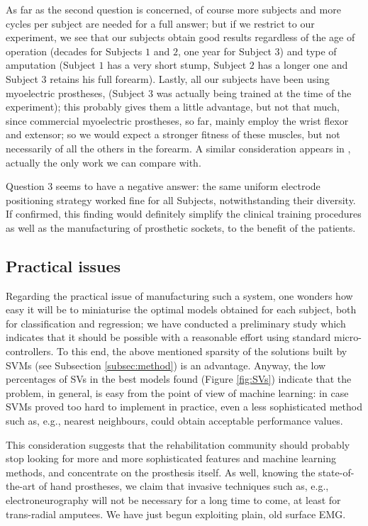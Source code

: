 As far as the second question is concerned, of course more subjects and more cycles per
subject are needed for a full answer; but if we restrict to our experiment, we see that
our subjects obtain good results regardless of the age of operation (decades for Subjects
$1$ and $2$, one year for Subject $3$) and type of amputation (Subject $1$ has a very
short stump, Subject $2$ has a longer one and Subject $3$ retains his full forearm).
Lastly, all our subjects have been using myoelectric prostheses, (Subject $3$
was actually being trained at the time of the experiment); this probably gives them
a little advantage, but not that much, since commercial myoelectric prostheses, so far,
mainly employ the wrist flexor and extensor; so we would expect a stronger fitness of
these muscles, but not necessarily of all the others in the forearm. A similar consideration
appears in \cite{sebelius}, actually the only work we can compare with.

Question $3$ seems to have a negative answer: the same uniform electrode positioning strategy
worked fine for all Subjects, notwithstanding their diversity.
If confirmed, this finding would definitely simplify the clinical training procedures as well
as the manufacturing of prosthetic sockets, to the benefit of the patients.

\subsection{Practical issues}

Regarding the practical issue of manufacturing such a system,
one wonders how easy it will be to miniaturise the optimal
models obtained for each subject, both for classification and regression;
we have conducted a preliminary study which indicates that it should be possible
with a reasonable effort using standard micro-controllers. To this end, the
above mentioned sparsity of the solutions built by SVMs (see Subsection
\ref{subsec:method}) is an advantage. Anyway, the low percentages of SVs in the
best models found (Figure \ref{fig:SVs}) indicate that the problem, in general,
is easy from the point of view of machine learning: in case SVMs proved too
hard to implement in practice, even a less sophisticated method such as, e.g.,
nearest neighbours, could obtain acceptable performance values.

This consideration suggests that the rehabilitation community should probably stop
looking for more and more sophisticated features and machine learning methods,
and concentrate on the prosthesis itself. As well, knowing the state-of-the-art of
hand prostheses, we claim that invasive techniques such as, e.g., electroneurography
\cite{cipriani} will not be necessary for a long time to come, at least for
trans-radial amputees. We have just begun exploiting plain, old surface EMG.


